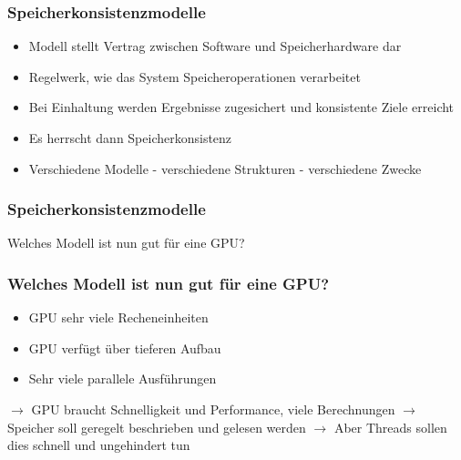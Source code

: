 \documentclass{sikslides}
\begin{document}
\begin{frame}
	\frametitle{Speicherkonsistenzmodelle}
	\begin{itemize}
		\item Modell stellt Vertrag zwischen Software und Speicherhardware dar
\bigskip
		\item Regelwerk, wie das System Speicheroperationen verarbeitet
\bigskip
		\item Bei Einhaltung werden Ergebnisse zugesichert und konsistente Ziele erreicht
\bigskip
		\item Es herrscht dann Speicherkonsistenz
\bigskip
		\item Verschiedene Modelle -  verschiedene Strukturen - verschiedene Zwecke
	\end{itemize}
\end{frame}


\begin{frame}
\frametitle{Speicherkonsistenzmodelle}
	Welches Modell ist nun gut für eine GPU?
\end{frame}

\begin{frame}
	\frametitle{Welches Modell ist nun gut für eine GPU?}
	\begin{itemize}
		\item GPU sehr viele Recheneinheiten
		\item GPU verfügt über tieferen Aufbau
\bigskip
		\item Sehr viele parallele Ausführungen
	\end{itemize}
	\bigskip
	$\rightarrow$ GPU braucht Schnelligkeit und Performance, viele Berechnungen
	\newline 
\bigskip
$\rightarrow$  Speicher soll geregelt beschrieben und gelesen werden
\newline
\bigskip
$\rightarrow$  Aber Threads sollen dies schnell und ungehindert tun
\end{frame}
\end{document}
